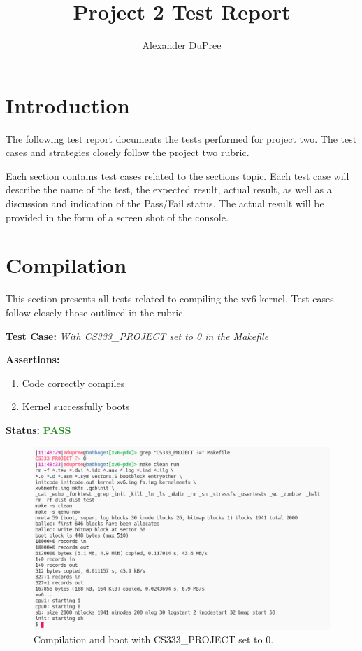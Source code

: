 \documentclass[11pt,letterpaper]{report}
\begin{document}
\title{Project 2 Test Report}
\author{Alexander DuPree}

\ifdefined \LF
{\Large     %
\fi

  \maketitle
  \section*{Introduction}
  \noindent
  The following test report documents the tests performed for project two. The test cases and strategies closely follow the project two rubric. 

  Each section contains test cases related to the sections topic. Each test case will describe the name of the test, 
  the expected result, actual result, as well as a discussion and indication of the Pass/Fail status. 
  The actual result will be provided in the form of a screen shot of the console. 

  \section*{Compilation}
  This section presents all tests related to compiling the xv6 kernel.
  Test cases follow closely those outlined in the rubric. \hfill \break
  
  \noindent\textbf{Test Case:} \emph{With CS333\_PROJECT set to 0 in the Makefile}
  
  \noindent\textbf{Assertions:}
  \begin{enumerate}[]
  \item Code correctly compiles
  \item Kernel successfully boots
  \end{enumerate}  
  
  \noindent\textbf{Status:} \textcolor{ForestGreen}{\textbf{PASS}}
  
  \begin{figure}[h!]
	\centering
	\includegraphics[width=1\linewidth]{compilation1.png}
	\caption[img]{Compilation and boot with CS333\_PROJECT set to 0.}
	\label{fig:P1compileP0-1}
  \end{figure}

}
\end{document}
